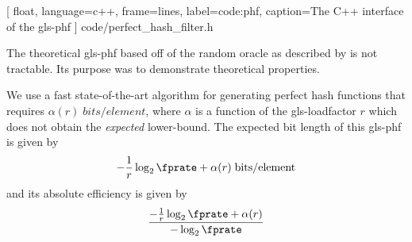 \documentclass[ ../main.tex]{subfiles}
\begin{document}

[
    float,
    language=c++,
    frame=lines,
    label={code:phf},
    caption={The C++ interface of the \gls{gls-phf}}
]
{code/perfect_hash_filter.h}


The theoretical \gls{gls-phf} based off of the random oracle as described by \cite{oph} is not tractable. Its purpose was to demonstrate theoretical properties.

We use a fast state-of-the-art algorithm \cite{chd} for generating perfect hash functions that requires $\alpha(r) \; \si{bits \per element}$, where $\alpha$ is a function of the \gls{gls-loadfactor} $r$ which does not obtain the \emph{expected} lower-bound. The expected bit length of this \gls{gls-phf} is given by
\begin{equation}
    -\frac{1}{r} \log_2 \fprate + \alpha(r) \; \si{bits \per element}
\end{equation}
and its absolute efficiency is given by
\begin{equation}
    \frac{-\frac{1}{r}\log_2 \fprate + \alpha(r)}{-\log_2 \fprate}
\end{equation}
\end{document}
